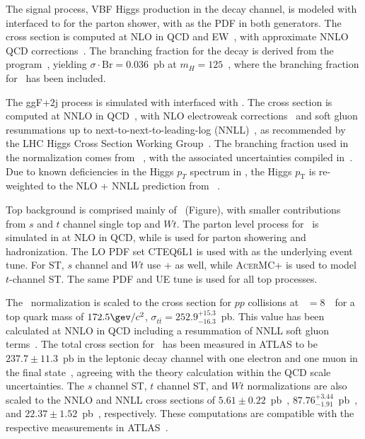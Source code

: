 The signal process, VBF Higgs production in the \ww decay channel, is
modeled with \POWHEG interfaced to  for the parton
shower, with \ctten as the PDF in both generators. The cross
section is computed at NLO in QCD and EW~\cite{Ciccolini:2007jr,Ciccolini:2007ec,Arnold:2008rz}, with approximate
NNLO QCD corrections~\cite{Bolzoni:2010xr}. The branching fraction for the \ww decay
is derived from the \hdecay
program~\cite{bib:Dittmaier:2011ti,bib:Dittmaier:2012vm,bib:Heinemeyer:2013tqa},
yielding $\sigma\cdot{\mathrm{Br}} = 0.036$~pb at $m_H = 125$~\gev, where the branching
fraction for \wwlnln~has been included. 

The ggF$+2$j process is simulated with \POWHEG interfaced with
. The cross section is computed at NNLO in
QCD~\cite{Djouadi:1991tka,Dawson:1990zj,Spira:1995rr,Harlander:2002wh,Anastasiou:2002yz,Ravindran:2003um},
with NLO electroweak corrections~\cite{Aglietti:2004nj,Actis:2008ug}
and soft gluon resummations up to
next-to-next-to-leading-log (NNLL)~\cite{Catani:2003zt}, as recommended by
the LHC Higgs Cross Section Working
Group~\cite{bib:Dittmaier:2011ti,bib:Dittmaier:2012vm,bib:Heinemeyer:2013tqa}. The
branching fraction used in the normalization comes from
\hdecay~\cite{Djouadi:1997yw}, with the associated uncertainties
compiled
in~\cite{bib:Dittmaier:2011ti,bib:Dittmaier:2012vm}. Due
to known deficiencies in the Higgs $p_T$ spectrum in \POWHEG, the
Higgs $p_{\mathrm{T}}$ is re-weighted to the NLO + NNLL prediction
from \HqT~\cite{deFlorian:2011xf}. 

Top background is comprised mainly of \ttbar~(Figure), with smaller
contributions from $s$ and
$t$ channel single top and $Wt$. The
parton level process for \ttbar~is simulated in \POWHEG at NLO in QCD,
while  is used for parton showering and
hadronization. The LO PDF set CTEQ6L1 is used with  as
the underlying event tune. For ST,
$s$ channel and $Wt$ use \POWHEGns + as well, while
\textsc{AcerMC}+ is used to model $t$-channel ST. The same
PDF and UE tune is used for all top processes.

The \ttbar~normalization is scaled to the cross section for $pp$
collisions at \sqrts~$=8$~\tev~for a top quark mass of
$172.5 \gev/c^2$, $\sigma_{t\bar{t}}=252.9^{+15.3}_{-16.3}$~pb. This
value has been
calculated at NNLO in QCD including a resummation of NNLL soft gluon
terms~\cite{bib:Cacciari:2011hy,bib:Beneke:2011mq,bib:Baernreuther:2012ws,bib:Czakon:2012zr,bib:Czakon:2012pz,bib:Czakon:2013goa,bib:Czakon:2011xx}.
The total cross section for \ttbar~has been measured in ATLAS to be
$237.7\pm11.3$~pb in the leptonic decay channel with one
electron and one muon in the final
state~\cite{bib:ttbar_cross_section}, agreeing with the
theory calculation within the QCD scale uncertainties. The $s$ channel
ST, $t$ channel ST, and $Wt$ normalizations are also scaled to the
NNLO and NNLL cross sections of
$5.61\pm0.22$~pb~\cite{bib:Kidonakis:2010tc},
$87.76^{+3.44}_{-1.91}$~pb~\cite{bib:Kidonakis:2011wy}, and
$22.37\pm1.52$~pb~\cite{bib:Kidonakis:2010ux}, respectively. These
computations are compatible with the respective measurements in
ATLAS~\cite{bib:tchan_cross_section,bib:Wt_cross_section}.

